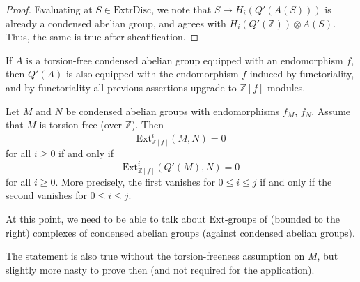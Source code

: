 \begin{proof}
  \leanok
  Evaluating at $S\in \mathrm{ExtrDisc}$, we note that $S\mapsto H_i(Q'(A(S)))$ is already a condensed abelian group,
  and agrees with $H_i(Q'(\mathbb Z))\otimes A(S)$. Thus, the same is true after sheafification.
\end{proof}

If $A$ is a torsion-free condensed abelian group equipped with an endomorphism $f$,
then $Q'(A)$ is also equipped with the endomorphism $f$ induced by functoriality,
and by functoriality all previous assertions upgrade to $\mathbb Z[f]$-modules.

\begin{proposition}
  \label{Qprime-prop}
  \leanok
  Let $M$ and $N$ be condensed abelian groups with endomorphisms $f_M$, $f_N$.
  Assume that $M$ is torsion-free (over $\mathbb Z$). Then
  \[ \mathrm{Ext}^i_{\mathbb Z[f]}(M,N)=0 \]
  for all $i\geq 0$ if and only if
  \[ \mathrm{Ext}^i_{\mathbb Z[f]}(Q'(M),N)=0 \]
  for all $i\geq 0$. More precisely, the first vanishes for $0\leq i\leq j$ if and only if the second vanishes for $0\leq i\leq j$.
\end{proposition}

At this point, we need to be able to talk about $\mathrm{Ext}$-groups of (bounded to the right) complexes of condensed abelian groups (against condensed abelian groups).

The statement is also true without the torsion-freeness assumption on $M$, but slightly more nasty to prove then (and not required for the application).

